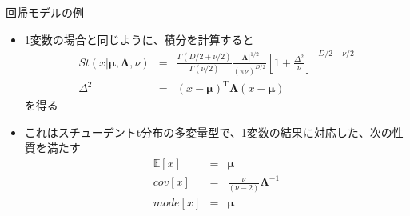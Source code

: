 \begin{frame}{回帰モデルの例}
 \begin{itemize}
  \item 1変数の場合と同じように、積分を計算すると
        \begin{eqnarray}
         St(x|\bm{\mu},\bm{\Lambda},\nu) &=& \frac{\Gamma(D/2+\nu/2)}{\Gamma(\nu/2)}\frac{|\bm{\Lambda}|^{1/2}}{(\pi\nu)^{D/2}}\left[1+\frac{\Delta^2}{\nu}\right]^{-D/2-\nu/2} \\
         \Delta^2&= & (x-\bm{\mu})^{\mathrm{T}}\bm{\Lambda}(x-\bm{\mu})
        \end{eqnarray}
        を得る
  \item これはスチューデントt分布の多変量型で、1変数の結果に対応した、次の性質を満たす
        \begin{eqnarray}
         \mathbb{E}[x]&=&\bm{\mu}\\
         cov[x]&=&\frac{\nu}{(\nu-2)}\bm{\Lambda}^{-1}\\
         mode[x]& =& \bm{\mu}
        \end{eqnarray}
 \end{itemize}
\end{frame}
